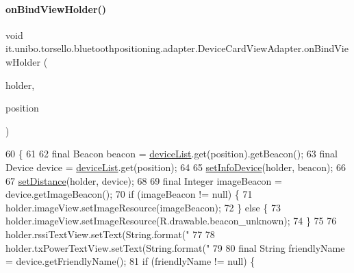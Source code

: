 \paragraph{\texorpdfstring{on\+Bind\+View\+Holder()}{onBindViewHolder()}}
{\footnotesize\ttfamily void it.\+unibo.\+torsello.\+bluetoothpositioning.\+adapter.\+Device\+Card\+View\+Adapter.\+on\+Bind\+View\+Holder (\begin{DoxyParamCaption}\item[{\hyperlink{classit_1_1unibo_1_1torsello_1_1bluetoothpositioning_1_1adapter_1_1DeviceCardViewAdapter_1_1DeviceViewHolder}{Device\+View\+Holder}}]{holder,  }\item[{final int}]{position }\end{DoxyParamCaption})}


\begin{DoxyCode}
60                                                                               \{
61 
62         \textcolor{keyword}{final} Beacon beacon = \hyperlink{classit_1_1unibo_1_1torsello_1_1bluetoothpositioning_1_1adapter_1_1DeviceCardViewAdapter_a72413f87c723c585bd1ad9bc5711cf39_a72413f87c723c585bd1ad9bc5711cf39}{deviceList}.get(position).getBeacon();
63         \textcolor{keyword}{final} Device device = \hyperlink{classit_1_1unibo_1_1torsello_1_1bluetoothpositioning_1_1adapter_1_1DeviceCardViewAdapter_a72413f87c723c585bd1ad9bc5711cf39_a72413f87c723c585bd1ad9bc5711cf39}{deviceList}.get(position);
64 
65         \hyperlink{classit_1_1unibo_1_1torsello_1_1bluetoothpositioning_1_1adapter_1_1DeviceCardViewAdapter_aa43ee1f594b3489f6e9e4b8e20ea1612_aa43ee1f594b3489f6e9e4b8e20ea1612}{setInfoDevice}(holder, beacon);
66 
67         \hyperlink{classit_1_1unibo_1_1torsello_1_1bluetoothpositioning_1_1adapter_1_1DeviceCardViewAdapter_a8d5baa2d386a92ba4fb20b71e6e517f9_a8d5baa2d386a92ba4fb20b71e6e517f9}{setDistance}(holder, device);
68 
69         \textcolor{keyword}{final} Integer imageBeacon = device.getImageBeacon();
70         \textcolor{keywordflow}{if} (imageBeacon != null) \{
71             holder.imageView.setImageResource(imageBeacon);
72         \} \textcolor{keywordflow}{else} \{
73             holder.imageView.setImageResource(R.drawable.beacon\_unknown);
74         \}
75 
76         holder.rssiTextView.setText(String.format(\textcolor{stringliteral}{"%
77 
78         holder.txPowerTextView.setText(String.format(\textcolor{stringliteral}{"%
79 
80         \textcolor{keyword}{final} String friendlyName = device.getFriendlyName();
81         \textcolor{keywordflow}{if} (friendlyName != null) \{
}}
\end{DoxyCode}
